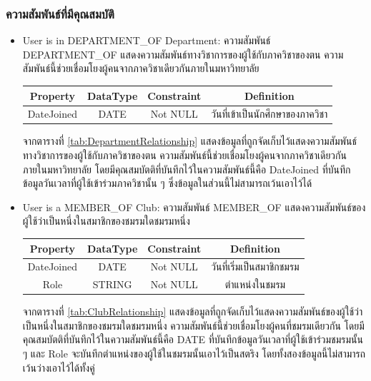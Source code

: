 \documentclass[14pt,oneside,openright,a4paper]{cpe-thai-project}
\begin{document}
    \subsubsection{ความสัมพันธ์ที่มีคุณสมบัติ}
    \begin{itemize}
      \normalsize
      \item User is in DEPARTMENT\_OF Department: ความสัมพันธ์ DEPARTMENT\_OF แสดงความสัมพันธ์ทางวิชาการของผู้ใช้กับภาควิชาของตน ความสัมพันธ์นี้ช่วยเชื่อมโยงผู้คนจากภาควิชาเดียวกันภายในมหาวิทยาลัย
        \begin{center}
          \begin{tabular}{|c|c|c|c|}
          \hline
          \rowcolor[HTML]{9FC5E8} 
          Property   & DataType & Constraint & Definition \\ \hline
          DateJoined & DATE     & Not NULL    & วันที่เข้าเป็นนักศึกษาของภาควิชา \\ \hline
          \end{tabular}
          \label{tab:DepartmentRelationship}
        \end{center}
        จากตารางที่ \ref{tab:DepartmentRelationship} แสดงข้อมูลที่ถูกจัดเก็บไว้แสดงความสัมพันธ์ทางวิชาการของผู้ใช้กับภาควิชาของตน ความสัมพันธ์นี้ช่วยเชื่อมโยงผู้คนจากภาควิชาเดียวกันภายในมหาวิทยาลัย โดยมีคุณสมบัตติที่บันทึกไว้ในความสัมพันธ์นี้คือ DateJoined ที่บันทึกข้อมูลวันเวลาที่ผู้ใช้เข้าร่วมภาควิชานั้น ๆ ซึ่งข้อมูลในส่วนนี้ไม่สามารถเว้นเอาไว้ได้ 
      \item User is a MEMBER\_OF Club: ความสัมพันธ์ MEMBER\_OF แสดงความสัมพันธ์ของผู้ใช้ว่าเป็นหนึ่งในสมาชิกของชมรมใดชมรมหนึ่ง
        \begin{center}
          \begin{tabular}{|c|c|c|c|}
          \hline
          \rowcolor[HTML]{9FC5E8} 
          Property   & DataType & Constraint & Definition \\ \hline
          DateJoined & DATE     & Not NULL    & วันที่เริ่มเป็นสมาชิกชมรม \\ \hline
          Role       & STRING   & Not NULL    & ตำแหน่งในชมรม \\ \hline
          \end{tabular}
          \label{tab:ClubRelationship}
        \end{center}
        จากตารางที่ \ref{tab:ClubRelationship} แสดงข้อมูลที่ถูกจัดเก็บไว้แสดงความสัมพันธ์ของผู้ใช้ว่าเป็นหนึ่งในสมาชิกของชมรมใดชมรมหนึ่ง ความสัมพันธ์นี้ช่วยเชื่อมโยงผู้คนที่ชมรมเดียวกัน โดยมีคุณสมบัตติที่บันทึกไว้ในความสัมพันธ์นี้คือ DATE ที่บันทึกข้อมูลวันเวลาที่ผู้ใช้เข้าร่วมชมรมนั้น ๆ และ Role จะบันทึกตำแหน่งของผู้ใช้ในชมรมนั้นเอาไว้เป็นสตริง โดยทั้งสองข้อมูลนี้ไม่สามารถเว้นว่างเอาไว้ได้ทั้งคู่

\end{itemize}
\end{document}
